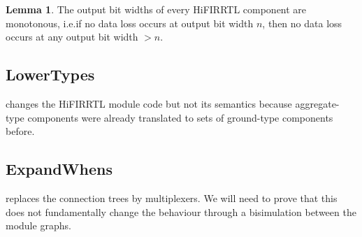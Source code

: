 \documentclass{article}
\theoremstyle{definition}
\newtheorem{lemma}[definition]{Lemma}
\begin{document}
\begin{lemma}
	The output bit widths of every HiFIRRTL component are monotonous,
	i.e.\@ if no data loss occurs at output bit width $n$,
	then no data loss occurs at any output bit width $>n$.
\end{lemma}

\subsection{LowerTypes}

changes the HiFIRRTL module code but not its semantics
because aggregate-type components were already translated to sets of ground-type components before.

\subsection{ExpandWhens}

replaces the connection trees by multiplexers.
We will need to prove that this does not fundamentally change the behaviour
through a bisimulation between the module graphs.
\end{document}
